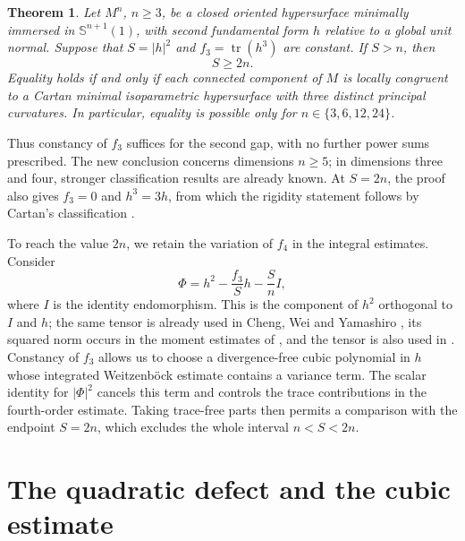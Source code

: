\documentclass[11pt,reqno]{amsart}
\numberwithin{equation}{section}
\newtheorem{theorem}{Theorem}[section]
\newcommand{\Sph}{\mathbb S}
\newcommand{\tr}{\operatorname{tr}}
\newcommand{\norm}[1]{\lvert #1\rvert}
\begin{document}
\begin{theorem}\label{thm:main}
Let $M^n$, $n\ge3$, be a closed oriented hypersurface minimally immersed in $\Sph^{n+1}(1)$, with second fundamental form $h$ relative to a global unit normal. Suppose that $S=\norm h^2$ and $f_3=\tr(h^3)$ are constant. If $S>n$, then
\[
S\ge2n.
\]
Equality holds if and only if each connected component of $M$ is locally congruent to a Cartan minimal isoparametric hypersurface with three distinct principal curvatures. In particular, equality is possible only for $n\in\{3,6,12,24\}$.
\end{theorem}

Thus constancy of $f_3$ suffices for the second gap, with no further power sums prescribed. The new conclusion concerns dimensions $n\ge5$; in dimensions three and four, stronger classification results are already known. At $S=2n$, the proof also gives $f_3=0$ and $h^3=3h$, from which the rigidity statement follows by Cartan's classification \cite{Cartan1939,Cecil2008}.

To reach the value $2n$, we retain the variation of $f_4$ in the integral estimates. Consider
\[
\Phi=h^2-\frac{f_3}{S}h-\frac Sn I,
\]
where $I$ is the identity endomorphism. This is the component of $h^2$ orthogonal to $I$ and $h$; the same tensor
is already used in Cheng, Wei and Yamashiro \cite{CWY}, its squared norm
occurs in the moment estimates of \cite{YangCheng,CWY}, and the tensor is
also used in \cite{Chen2026}. Constancy of $f_3$ allows us to choose a divergence-free cubic polynomial in $h$ whose integrated Weitzenb\"ock estimate contains a variance term. The scalar identity for $\norm\Phi^2$ cancels this term and controls the trace contributions in the fourth-order estimate. Taking trace-free parts then permits a comparison with the endpoint $S=2n$, which excludes the whole interval $n<S<2n$.

\section{The quadratic defect and the cubic estimate}\label{sec:defect}
\end{document}
